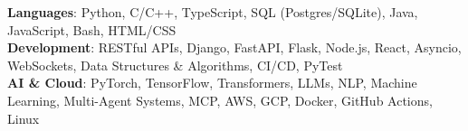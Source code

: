 \begin{itemize}[leftmargin=0.15in, label={}]
    \small{\item{
     \textbf{Languages}{: Python, C/C++, TypeScript, SQL (Postgres/SQLite), Java, JavaScript, Bash, HTML/CSS} \\
     \textbf{Development}{: RESTful APIs, Django, FastAPI, Flask, Node.js, React, Asyncio, WebSockets, Data Structures \& Algorithms, CI/CD, PyTest} \\
     \textbf{AI \& Cloud}{: PyTorch, TensorFlow, Transformers, LLMs, NLP, Machine Learning, Multi-Agent Systems, MCP, AWS, GCP, Docker, GitHub Actions, Linux}
    }}
\end{itemize}
